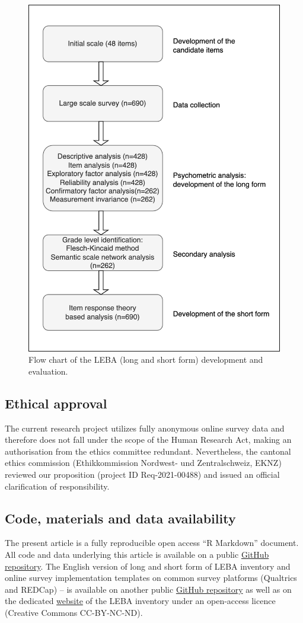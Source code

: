 \documentclass[
  man]{apa6}
\begin{document}
\begin{figure}

{\centering \includegraphics[width=0.5\linewidth,height=0.5\textheight]{Figures/Figure1} 

}

\caption{Flow chart of the LEBA (long and short form) development and evaluation. }\label{fig:FlowchartFig}
\end{figure}

\hypertarget{ethical-approval}{%
\subsection{Ethical approval}\label{ethical-approval}}

The current research project utilizes fully anonymous online survey data and therefore does not fall under the scope of the Human Research Act, making an authorisation from the ethics committee redundant. Nevertheless, the cantonal ethics commission (Ethikkommission Nordwest- und Zentralschweiz, EKNZ) reviewed our proposition (project ID Req-2021-00488) and issued an official clarification of responsibility.

\hypertarget{code-materials-and-data-availability}{%
\subsection{Code, materials and data availability}\label{code-materials-and-data-availability}}

The present article is a fully reproducible open access ``R Markdown'' document. All code and data underlying this article is available on a public \href{https://github.com/leba-instrument}{GitHub repository}. The English version of long and short form of LEBA inventory and online survey implementation templates on common survey platforms (Qualtrics and REDCap) -- is available on another public \href{https://github.com/leba-instrument/leba-instrument-en}{GitHub repository} as well as on the dedicated \href{https://leba-instrument.org/}{website} of the LEBA inventory under an open-access licence (Creative Commons CC-BY-NC-ND).
\end{document}

